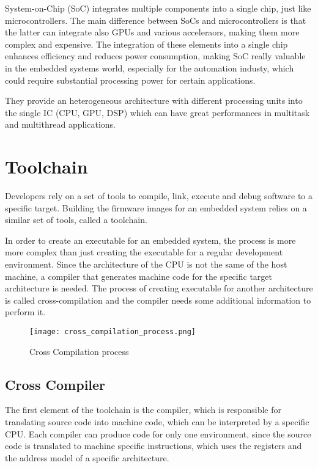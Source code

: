 System-on-Chip (SoC) integrates multiple components into a single chip, just
like microcontrollers.
The main difference between SoCs and microcontrollers is that the latter can
integrate also GPUs and various acceleraors, making them more complex and
expensive.
The integration of these elements into a single chip enhances efficiency and
reduces power consumption, making SoC really valuable in the embedded systems
world, especially for the automation industy, which could require substantial
processing power for certain applications.

They provide an heterogeneous architecture with different processing units
into the single IC (CPU, GPU, DSP) which can have great performances in
multitask and multithread applications.

\section{Toolchain} 

Developers rely on a set of tools to compile, link, execute and debug software
to a specific target.
Building the firmware images for an embedded system relies on a similar set of
tools, called a toolchain.

In order to create an executable for an embedded system, the process is more
more complex than just creating the executable for a regular development
environment.
Since the architecture of the CPU is not the same of the host machine, a
compiler that generates machine code for the specific target architecture is
needed.
The process of creating executable for another architecture is called
cross-compilation and the compiler needs some additional information
to perform it.

\begin{figure}[ht]
    \centering
    \texttt{[image: cross\_compilation\_process.png]}
    \caption{Cross Compilation process}
    \label{fig:cross_compilation}
\end{figure}

\subsection{Cross Compiler}

The first element of the toolchain is the compiler, which is responsible for
translating source code into machine code, which can be interpreted by a
specific CPU.
Each compiler can produce code for only one environment, since the source code
is translated to machine specific instructions, which uses the registers and
the address model of a specific architecture.

